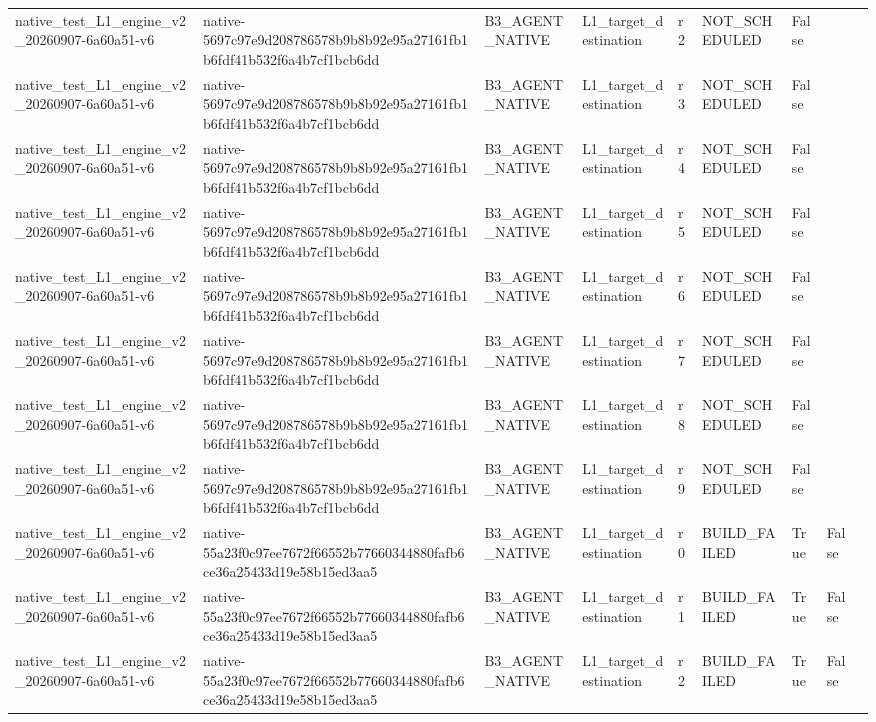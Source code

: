 \begin{tabular}{lllllllll}
native\_test\_L1\_engine\_v2\_20260907-6a60a51-v6 & native-5697c97e9d208786578b9b8b92e95a27161fb1b6fdf41b532f6a4b7cf1bcb6dd & B3\_AGENT\_NATIVE & L1\_target\_destination & r2 & NOT\_SCHEDULED & False &  &  \\
native\_test\_L1\_engine\_v2\_20260907-6a60a51-v6 & native-5697c97e9d208786578b9b8b92e95a27161fb1b6fdf41b532f6a4b7cf1bcb6dd & B3\_AGENT\_NATIVE & L1\_target\_destination & r3 & NOT\_SCHEDULED & False &  &  \\
native\_test\_L1\_engine\_v2\_20260907-6a60a51-v6 & native-5697c97e9d208786578b9b8b92e95a27161fb1b6fdf41b532f6a4b7cf1bcb6dd & B3\_AGENT\_NATIVE & L1\_target\_destination & r4 & NOT\_SCHEDULED & False &  &  \\
native\_test\_L1\_engine\_v2\_20260907-6a60a51-v6 & native-5697c97e9d208786578b9b8b92e95a27161fb1b6fdf41b532f6a4b7cf1bcb6dd & B3\_AGENT\_NATIVE & L1\_target\_destination & r5 & NOT\_SCHEDULED & False &  &  \\
native\_test\_L1\_engine\_v2\_20260907-6a60a51-v6 & native-5697c97e9d208786578b9b8b92e95a27161fb1b6fdf41b532f6a4b7cf1bcb6dd & B3\_AGENT\_NATIVE & L1\_target\_destination & r6 & NOT\_SCHEDULED & False &  &  \\
native\_test\_L1\_engine\_v2\_20260907-6a60a51-v6 & native-5697c97e9d208786578b9b8b92e95a27161fb1b6fdf41b532f6a4b7cf1bcb6dd & B3\_AGENT\_NATIVE & L1\_target\_destination & r7 & NOT\_SCHEDULED & False &  &  \\
native\_test\_L1\_engine\_v2\_20260907-6a60a51-v6 & native-5697c97e9d208786578b9b8b92e95a27161fb1b6fdf41b532f6a4b7cf1bcb6dd & B3\_AGENT\_NATIVE & L1\_target\_destination & r8 & NOT\_SCHEDULED & False &  &  \\
native\_test\_L1\_engine\_v2\_20260907-6a60a51-v6 & native-5697c97e9d208786578b9b8b92e95a27161fb1b6fdf41b532f6a4b7cf1bcb6dd & B3\_AGENT\_NATIVE & L1\_target\_destination & r9 & NOT\_SCHEDULED & False &  &  \\
native\_test\_L1\_engine\_v2\_20260907-6a60a51-v6 & native-55a23f0c97ee7672f66552b77660344880fafb6ce36a25433d19e58b15ed3aa5 & B3\_AGENT\_NATIVE & L1\_target\_destination & r0 & BUILD\_FAILED & True & False &  \\
native\_test\_L1\_engine\_v2\_20260907-6a60a51-v6 & native-55a23f0c97ee7672f66552b77660344880fafb6ce36a25433d19e58b15ed3aa5 & B3\_AGENT\_NATIVE & L1\_target\_destination & r1 & BUILD\_FAILED & True & False &  \\
native\_test\_L1\_engine\_v2\_20260907-6a60a51-v6 & native-55a23f0c97ee7672f66552b77660344880fafb6ce36a25433d19e58b15ed3aa5 & B3\_AGENT\_NATIVE & L1\_target\_destination & r2 & BUILD\_FAILED & True & False &  \\

\end{tabular}

